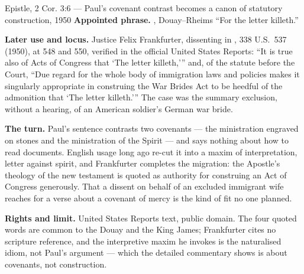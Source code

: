 \begin{afterlife}{Epistle, 2 Cor. 3:6 --- Paul's covenant contrast becomes a canon of statutory construction, 1950}
\textbf{Appointed phrase.} , Douay--Rheims ``For
the letter killeth.''

\textbf{Later use and locus.} Justice Felix Frankfurter, dissenting in
, 338 U.S.\ 537 (1950), at
548 and 550, verified in the official United States Reports: ``It is true also
of Acts of Congress that `The letter killeth,''' and, of the statute before
the Court, ``Due regard for the whole body of immigration laws and policies
makes it singularly appropriate in construing the War Brides Act to be heedful
of the admonition that `The letter killeth.'\thinspace'' The case was the
summary exclusion, without a hearing, of an American soldier's German war
bride.

\textbf{The turn.} Paul's sentence contrasts two covenants --- the
ministration engraved on stones and the ministration of the Spirit --- and
says nothing about how to read documents. English usage long ago re-cut it
into a maxim of interpretation, letter against spirit, and Frankfurter
completes the migration: the Apostle's theology of the new testament is quoted
as authority for construing an Act of Congress generously. That a dissent on
behalf of an excluded immigrant wife reaches for a verse about a covenant of
mercy is the kind of fit no one planned.

\textbf{Rights and limit.} United States Reports text, public domain. The four
quoted words are common to the Douay and the King James; Frankfurter cites no
scripture reference, and the interpretive maxim he invokes is the naturalised
idiom, not Paul's argument --- which the detailed commentary shows is about
covenants, not construction.
\end{afterlife}

